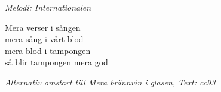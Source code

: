 {\footnotesize\textit{Melodi: Internationalen}}\par
\vspace{10pt}
Mera verser i sången\\
mera sång i vårt blod\\
mera blod i tampongen\\
så blir tampongen mera god\par
\vspace{10pt}
{\footnotesize\textit{Alternativ omstart till Mera brännvin i glasen, Text: cc93}}
